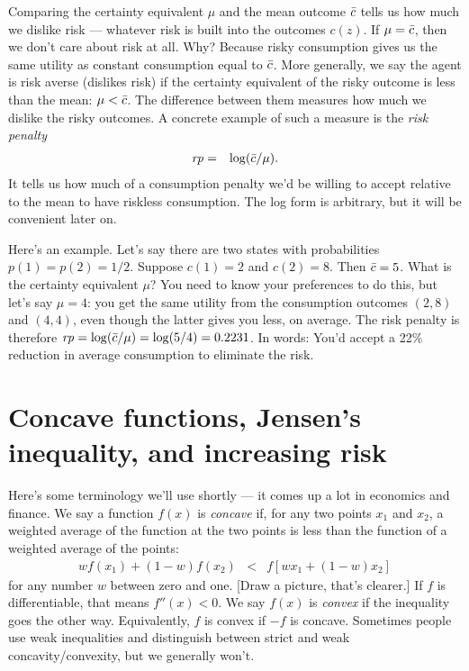 \documentclass[11pt]{article}
\begin{document}
Comparing the certainty equivalent $\mu$ and the mean outcome $\bar{c}$
tells us how much we dislike risk --- whatever risk is built into the outcomes $c(z)$.
If $\mu = \bar{c}$,
then we don't care about risk at all.
Why?
Because risky consumption gives us the same
utility as constant consumption equal to $\bar{c}$.
More generally, we say the agent is risk averse (dislikes risk)
if the certainty equivalent of the risky outcome
is less than the mean:   $\mu < \bar{c}$.
The difference between them measures how much we dislike the risky outcomes.
A concrete example of such a measure is the {\it risk penalty\/}
\begin{eqnarray}
    \mbox{\em rp\/} &=& \log (\bar{c}/\mu)  .
    \label{eq:rp-def}
\end{eqnarray}
It tells us how much of a consumption penalty we'd be willing to accept
relative to the mean to have riskless consumption.
The log form is arbitrary, but it will be convenient later on.

Here's an example.
Let's say there are two states with probabilities
$p(1) = p(2) = 1/2$.
Suppose $c(1) = 2$ and $c(2) = 8$.
Then $\bar{c} = 5$.
What is the certainty equivalent $\mu$?
You need to know your preferences to do this,
but let's say $\mu = 4$:  you get the same utility
from the consumption outcomes $(2,8)$ and $(4,4)$,
even though the latter gives you less, on average.
The risk penalty is therefore
$ \mbox{\em rp\/} = \log (\bar{c}/\mu) = \log(5/4) = 0.2231$.
In words: You'd accept a 22\% reduction in average consumption to eliminate the risk.


\section{Concave functions, Jensen's inequality, and increasing risk}

Here's some terminology we'll use shortly --- it comes up a lot
in economics and finance.
We say a function $f(x)$ is {\it concave\/}
if, for any two points $x_1$ and $x_2$,
a weighted average of the function at the two points
is less than the function of a weighted average of the points:
\begin{eqnarray}
    w f(x_1) + (1-w) f(x_2) &<& f[ w x_1 + (1-w) x_2]
    \label{eq:concave-def}
\end{eqnarray}
for any number $w$ between zero and one.
[Draw a picture, that's clearer.]
If $f$ is differentiable, that means $f''(x) < 0$.
We say $f(x)$ is  {\it convex\/}
if the inequality goes the other way.
Equivalently, $f$ is convex if $-f$ is concave.
Sometimes people use weak inequalities and distinguish
between strict and weak concavity/convexity, but we generally won't.
\end{document}
